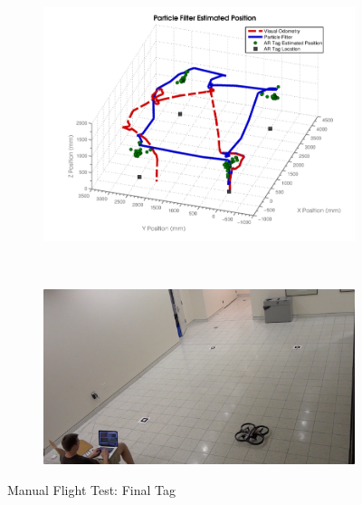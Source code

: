	\begin{figure}[ht]
	        \centering
	        \begin{subfigure}[b]{0.75\textwidth}
	                \centering
	                \includegraphics[width=\textwidth]{../images/3dgraph_100.png}
	                \label{fig:tag5}
	        \end{subfigure}%
	        \\
	        \begin{subfigure}[b]{0.75\textwidth}
	                \centering
	                \includegraphics[width=\textwidth]{../images/frame5.png}
	                \label{fig:frame5}
	        \end{subfigure}
	        \caption{Manual Flight Test: Final Tag}
	\end{figure}